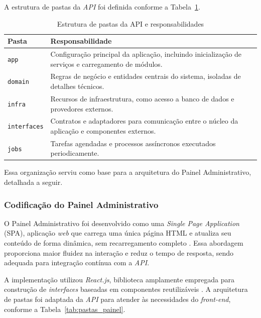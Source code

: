 A estrutura de pastas da \emph{API} foi definida conforme a Tabela~\ref{tab:pastas_api}.

\begin{table}[H]
\centering
\begin{tabular}{|l|p{10cm}|}
\hline
\textbf{Pasta} & \textbf{Responsabilidade} \\ \hline
\texttt{app} & Configuração principal da aplicação, incluindo inicialização de serviços e carregamento de módulos. \\ \hline
\texttt{domain} & Regras de negócio e entidades centrais do sistema, isoladas de detalhes técnicos. \\ \hline
\texttt{infra} & Recursos de infraestrutura, como acesso a banco de dados e provedores externos. \\ \hline
\texttt{interfaces} & Contratos e adaptadores para comunicação entre o núcleo da aplicação e componentes externos. \\ \hline
\texttt{jobs} & Tarefas agendadas e processos assíncronos executados periodicamente. \\ \hline
\end{tabular}
\caption{Estrutura de pastas da API e responsabilidades}
\label{tab:pastas_api}
\end{table}

Essa organização serviu como base para a arquitetura do Painel Administrativo, detalhada a seguir.

\subsubsection{Codificação do Painel Administrativo}

O Painel Administrativo foi desenvolvido como uma \emph{Single Page Application} (SPA), aplicação \emph{web} que carrega uma única página HTML e atualiza seu conteúdo de forma dinâmica, sem recarregamento completo \cite{spamdn}. Essa abordagem proporciona maior fluidez na interação e reduz o tempo de resposta, sendo adequada para integração contínua com a \emph{API}.

A implementação utilizou \emph{React.js}, biblioteca amplamente empregada para construção de \emph{interfaces} baseadas em componentes reutilizáveis \cite{react}. A arquitetura de pastas foi adaptada da \emph{API} para atender às necessidades do \emph{front-end}, conforme a Tabela~\ref{tab:pastas_painel}.

